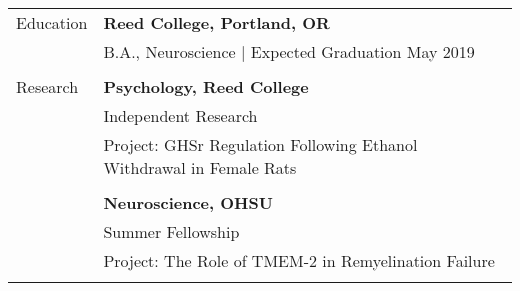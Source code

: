 \documentclass[letterpaper,11pt,oneside]{article}
\begin{document}
\noindent \begin{tabular}{@{} l l}
 \Large{Education}    & \textbf{Reed College, Portland, OR} \\
     & B.A., Neuroscience $\vert$ Expected Graduation May 2019\\
     \\
 \Large{Research}    & \textbf{Psychology, Reed College} \\
     & Independent Research \\
     & Project: GHSr Regulation Following Ethanol Withdrawal in Female Rats \\
     & \\
     & \textbf{Neuroscience, OHSU} \\
     & Summer Fellowship \\
     & Project: The Role of TMEM-2 in Remyelination Failure\\
     & \\


\end{tabular}
\end{document}
